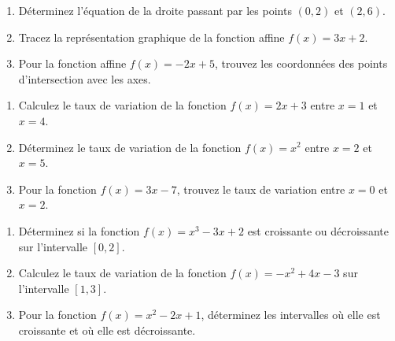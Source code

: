 \documentclass[12pt,a4paper,french]{book}
\begin{document}
\begin{exocor}
\begin{enumerate}
    \item Déterminez l'équation de la droite passant par les points \( (0, 2) \) et \( (2, 6) \).
    \item Tracez la représentation graphique de la fonction affine \( f(x) = 3x + 2 \).
    \item Pour la fonction affine \( f(x) = -2x + 5 \), trouvez les coordonnées des points d'intersection avec les axes.
\end{enumerate}
\end{exocor}

\begin{exocor}
\begin{enumerate}
    \item Calculez le taux de variation de la fonction \( f(x) = 2x + 3 \) entre \( x = 1 \) et \( x = 4 \).
    \item Déterminez le taux de variation de la fonction \( f(x) = x^2 \) entre \( x = 2 \) et \( x = 5 \).
    \item Pour la fonction \( f(x) = 3x - 7 \), trouvez le taux de variation entre \( x = 0 \) et \( x = 2 \).
\end{enumerate}
\end{exocor}

\begin{exocor}
\begin{enumerate}
    \item Déterminez si la fonction \( f(x) = x^3 - 3x + 2 \) est croissante ou décroissante sur l'intervalle \( [0, 2] \).
    \item Calculez le taux de variation de la fonction \( f(x) = -x^2 + 4x - 3 \) sur l'intervalle \( [1, 3] \).
    \item Pour la fonction \( f(x) = x^2 - 2x + 1 \), déterminez les intervalles où elle est croissante et où elle est décroissante.
\end{enumerate}
\end{exocor}
\end{document}
